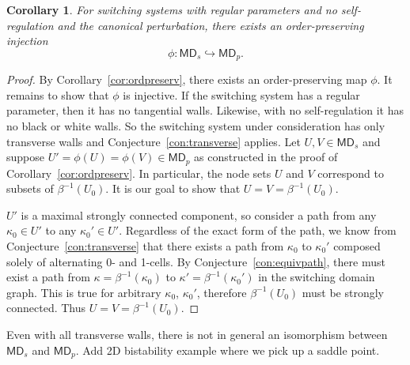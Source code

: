 \documentclass[12pt]{article}
\newtheorem{cor}{Corollary}[section]
\theoremstyle{definition}
\theoremstyle{remark}
\begin{document}
\vspace{12pt}


\begin{cor}
	For switching systems with regular parameters and no self-regulation and the canonical perturbation, there exists an order-preserving injection
	\[ \phi: \mathsf{MD}_s \hookrightarrow \mathsf{MD}_p. \]	
\end{cor}
\begin{proof}
	By Corollary~\ref{cor:ordpreserv}, there exists an order-preserving map $\phi$. It remains to show that $\phi$ is injective. If the switching system has a regular parameter, then it has no tangential walls. Likewise, with no self-regulation it has no black or white walls. So the switching system under consideration has only transverse walls and Conjecture~\ref{con:transverse} applies. Let $U,V \in \mathsf{MD}_s$ and suppose $U' = \phi(U) = \phi(V) \in \mathsf{MD}_p$ as constructed in the proof of Corollary~\ref{cor:ordpreserv}. In particular, the node sets $U$ and $V$ correspond to subsets of $\beta^{-1}(U_0)$. It is our goal to show that $U = V = \beta^{-1}(U_0)$.

	$U'$ is a maximal strongly connected component, so consider a path from any $\kappa_0 \in U'$ to any $\kappa_0' \in U'$. Regardless of the exact form of the path, we know from Conjecture~\ref{con:transverse} that there exists a path from $\kappa_0$ to $\kappa_0'$ composed solely of alternating 0- and 1-cells. By Conjecture~\ref{con:equivpath}, there must exist a path from $\kappa = \beta^{-1}(\kappa_0)$ to $\kappa' = \beta^{-1}(\kappa_0')$ in the switching domain graph. This is true for arbitrary $\kappa_0$, $\kappa_0'$, therefore $\beta^{-1}(U_0)$ must be strongly connected. Thus $U = V = \beta^{-1}(U_0)$. 
\end{proof}

Even with all transverse walls, there is not in general an isomorphism between $\mathsf{MD}_s$ and $\mathsf{MD}_p$. {\color{red} Add 2D bistability example where we pick up a saddle point.}
\end{document}
